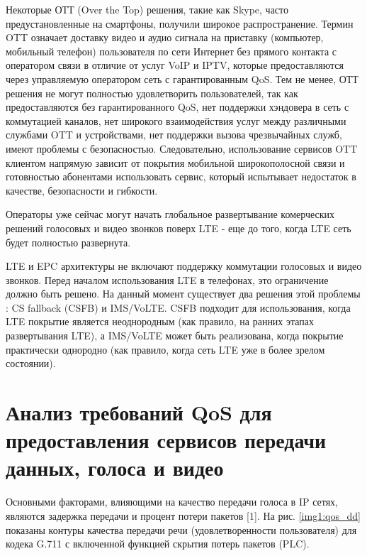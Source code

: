 Некоторые ОТТ (Over the Top) решения, такие как Skype, часто предустановленные на смартфоны, получили широкое распространение. Термин OTT означает доставку видео и аудио сигнала на приставку (компьютер, мобильный телефон) пользователя по сети Интернет без прямого контакта с оператором связи в отличие от услуг VoIP и IPTV, которые предоставляются через управляемую оператором сеть с гарантированным QoS. Тем не менее, ОТТ решения не могут полностью удовлетворить пользователей, так как предоставляются без гарантированного QoS, нет поддержки хэндовера в сеть с коммутацией каналов, нет широкого взаимодействия услуг между различными службами OTT и устройствами, нет поддержки вызова чрезвычайных служб, имеют проблемы с безопасностью. Следовательно, использование сервисов OTT клиентом напрямую зависит от покрытия мобильной широкополосной связи и готовностью абонентами использовать сервис, который испытывает недостаток в качестве, безопасности и гибкости. 

Операторы уже сейчас могут начать глобальное развертывание комерческих решений голосовых и видео звонков поверх LTE - еще до того, когда LTE сеть будет полностью развернута.

LTE и EPC архитектуры не включают поддержку коммутации голосовых и видео звонков. 
Перед началом использования LTE в телефонах, это ограничение должно быть решено. На данный момент существует два решения этой проблемы \cite{ericsson_backgrounder}: CS fallback (CSFB) и IMS/VoLTE. CSFB подходит для использования, когда LTE покрытие является неоднородным (как правило, на ранних этапах развертывания LTE), а IMS/VoLTE может быть реализована, когда покрытие практически однородно (как правило, когда сеть LTE уже в более зрелом состоянии).






\section{Анализ требований QoS для предоставления сервисов передачи данных, голоса и видео } \label{sect_qos}

Основными факторами,  влияющими на качество передачи голоса в IP  сетях,  являются задержка передачи и процент потери пакетов [1].
На рис. \ref{img1:qos_dd} показаны контуры качества передачи речи (удовлетворенности пользователя) для кодека G.711 с включенной функцией скрытия потерь пакетов (PLC).

